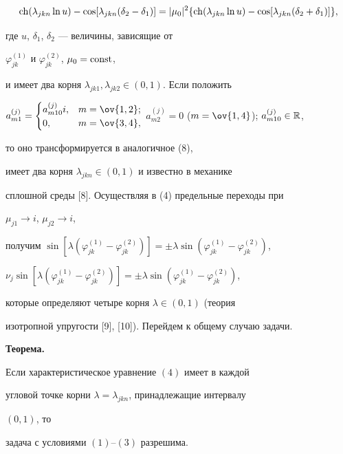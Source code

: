 \begin{equation} 


\ch(\lambda_{jkn}\ln u)-\cos[\lambda_{jkn} 


(\delta_2-\delta_1)]=|\mu_0|^2\{\ch(\lambda_{jkn}\ln u)- 


\cos[\lambda_{jkn}(\delta_2+\delta_1)]\}, 


\end{equation}  


где $u$, $\delta_1$, $\delta_2$ --- величины, зависящие от 


$\varphi^{(1)}_{jk}$ и $\varphi^{(2)}_{jk}$, $\mu_0=\operatorname{const}$, 


и имеет два корня $\lambda_{jk1},\lambda_{jk2}\in(0,1)$. Если положить 


$a^{(j)}_{m1}=\begin{cases} 


a^{(j)}_{m10}i, &m=\ov{1,2};\\ 


0, & m=\ov{3,4}, 


\end{cases}$ $a^{(j)}_{m2}=0$ ($m=\ov{1,4}$); $a^{(j)}_{m10}\in\Bbb R$, 


то оно трансформируется в аналогичное (8), 


имеет два корня $\lambda_{jkn}\in(0,1)$ и известно в механике 


сплошной среды [8]. Осуществляя в (4) предельные переходы при 


$\mu_{j1}\to i$, $\mu_{j2}\to i$, 


получим $\sin[\lambda(\varphi^{(1)}_{jk}-\varphi^{(2)}_{jk})]= 


\pm\lambda\sin(\varphi^{(1)}_{jk}-\varphi^{(2)}_{jk})$, 


$\nu_j\sin[\lambda(\varphi^{(1)}_{jk}-\varphi^{(2)}_{jk})]= 


\pm\lambda\sin(\varphi^{(1)}_{jk}-\varphi^{(2)}_{jk})$, 


которые определяют четыре корня $\lambda\in(0,1)$ (теория 


изотропной упругости [9], [10]). Перейдем к общему случаю задачи. 


\medskip 


 


{\bf Теорема.}{\it 


Если характеристическое уравнение $(4)$ имеет в каждой 


угловой точке корни $\lambda=\lambda_{jkn}$, принадлежащие интервалу 


$(0,1)$, то 


задача с условиями $(1)$--$(3)$ разрешима. 


} 


